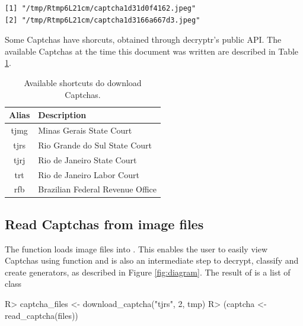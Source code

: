 \documentclass[article,nojss]{jss}
\begin{document}
\begin{verbatim}
[1] "/tmp/Rtmp6L21cm/captcha1d31d0f4162.jpeg"                               
[2] "/tmp/Rtmp6L21cm/captcha1d3166a667d3.jpeg"
\end{verbatim}

Some Captchas have shorcuts, obtained through decryptr's public API. The
available Captchas at the time this document was written are described
in Table \ref{tab:avaliable-captchas}.

\begin{CodeChunk}
\begin{table}[t]

\caption{\label{tab:avaliable-captchas}Available shortcuts do download Captchas.}
\centering
\begin{tabular}{cl}
\toprule
Alias & Description\\
\midrule
tjmg & Minas Gerais State Court\\
tjrs & Rio Grande do Sul State Court\\
tjrj & Rio de Janeiro State Court\\
trt & Rio de Janeiro Labor Court\\
rfb & Brazilian Federal Revenue Office\\
\bottomrule
\end{tabular}
\end{table}

\end{CodeChunk}

\hypertarget{read-captchas-from-image-files}{%
\subsection{Read Captchas from image
files}\label{read-captchas-from-image-files}}

The  function loads image files into .
This enables the user to easily view Captchas using 
function and is also an intermediate step to decrypt, classify and
create generators, as described in Figure \ref{fig:diagram}. The result
of  is a list of  class 

\begin{CodeChunk}

\begin{CodeInput}
R> captcha_files <- download_captcha("tjrs", 2, tmp)
R> (captcha <- read_captcha(files))
\end{CodeInput}
\end{CodeChunk}
\end{document}
